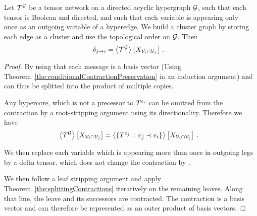 \begin{theorem}
	Let $\mathcal{T}^{\mathcal{G}}$ be a tensor network on a directed acyclic hypergraph $\mathcal{G}$, such that each tensor is Boolean and directed, and such that each variable is appearing only once as an outgoing variable of a hyperedge.
	We build a cluster graph by storing each edge as a cluster and use the topological order on $\mathcal{G}$.
	Then
		\[ \delta_{j \rightarrow i} = \left\langle \mathcal{T}^{\mathcal{G}}\right\rangle \left[ X_{\mathcal{V}_i\cap\mathcal{V}_j} \right] \, . \]
\end{theorem}
\begin{proof}
	By using that each message is a basis vector (Using Theorem~\ref{the:conditionalContractionPreservation} in an induction argument) and can thus be splitted into the product of multiple copies.

	Any hypercore, which is not a precessor to $T^{e_{i}}$ can be omitted from the contraction by a root-stripping argument using its directionality.
	Therefore we have
	\begin{align*}
		\left\langle \mathcal{T}^{\mathcal{G}}\right\rangle \left[ X_{\mathcal{V}_i\cap\mathcal{V}_j} \right]
		= \left\langle \{T^{e_{\tilde{j}}} \, : \, e_{\tilde{j}} \prec e_{i} \}\right\rangle \left[ X_{\mathcal{V}_i\cap\mathcal{V}_j} \right] \, . 
	\end{align*}

	We then replace each variable which is appearing more than once in outgoing legs by a delta tensor, which does not change the contraction by .
	
	We then follow a leaf stripping argument and apply Theorem~\ref{the:splittingContractions} iteratively on the remaining leaves. 
	Along that line, the leave and its successors are contracted.
	The contraction is a basis vector and can therefore be represented as an outer product of basis vectors.

\end{proof}



